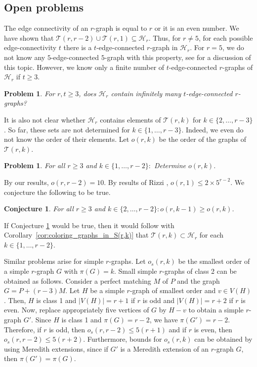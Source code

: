 \documentclass[a4paper,11pt]{article}
\newcommand{\ca}{\mathcal}
\newtheorem{con}[defi]{Conjecture}
\newtheorem{prob}[defi]{Problem}
\theoremstyle{remark}
\begin{document}
\subsection{Open problems}

The edge connectivity of an $r$-graph is equal to $r$ or it is an even number.  
We have shown that $\ca T(r,r-2) \cup \ca T(r,1) \subseteq \ca H_r$.
Thus, for $r \not =5$, for each possible edge-connectivity $t$ there is 
a $t$-edge-connected $r$-graph in $\ca H_r$. For $r=5$, we do not know any 
$5$-edge-connected $5$-graph with this property, see \cite{MMSW_pdpm}
for a discussion of this topic. However, we know only a finite 
number of $t$-edge-connected $r$-graphs of $\ca H_r$ if $t \geq 3$. 

\begin{prob}
	For $r,t \geq 3$, does $\ca H_r$ contain infinitely many $t$-edge-connected 
	$r$-graphs?
\end{prob}

It is also not clear whether $\ca H_r$ contains elements
of $\ca T(r,k)$ for $k \in \{2, \dots, r-3\}$. 
So far, these sets are not determined for $k \in \{1, \dots, r-3\}$. 
Indeed, we even do not know the order of their elements. 
Let 
$o(r,k)$ be the order of the graphs of $\ca T(r,k)$. 

\begin{prob}\label{o(r,k)}
	For all $r \geq 3$ and $k \in \{1, \dots, r-2 \}\colon$ Determine $o(r,k)$.  
\end{prob}

By our results, $o(r,r-2) = 10$.
By results of Rizzi \cite{rizzi1999indecomposable}, $o(r,1) \leq 2 \times 5^{r-2}$. We conjecture the following to be true.

\begin{con} \label{conj: order}
	For all $r \geq 3$ and $k \in \{2, \dots, r-2\} \colon o(r,k-1) \geq o(r,k)$.
\end{con} 

If Conjecture \ref{conj: order} would be true, then it would follow
with Corollary~\ref{cor:coloring_graphs_in_S(r,k)} that $\ca T(r,k) \subset \ca H_r$ 
for each $k \in \{1, \dots, r-2\}$. 

Similar problems arise for simple $r$-graphs. Let $o_s(r,k)$ be the smallest
order of a simple $r$-graph $G$ with $\pi(G)=k$.
Small simple $r$-graphs of class 2 can be obtained as follows. Consider a perfect matching $M$ of $P$ and the graph $G=P+(r-3)M$. Let $H$ be a simple $r$-graph of smallest order and $v \in V(H)$. Then, $H$ is class 1 and $|V(H)|=r+1$ if $r$ is odd and $|V(H)|=r+2$ if $r$ is even. Now, replace appropriately five vertices of $G$ by $H-v$ to obtain a simple $r$-graph $G'$. Since $H$ is class 1 and $\pi(G)=r-2$, we have $\pi (G')=r-2$.   Therefore, if $r$ is odd, then $o_s(r,r-2) \leq 5(r+1)$ and
if $r$ is even, then $o_s(r,r-2) \leq 5(r+2)$. Furthermore, bounds for $o_s(r,k)$ can be obtained by using Meredith extensions, since if $G'$ is a Meredith extension of an $r$-graph $G$, then $\pi(G')=\pi(G)$.








	


{}

\end{document}

